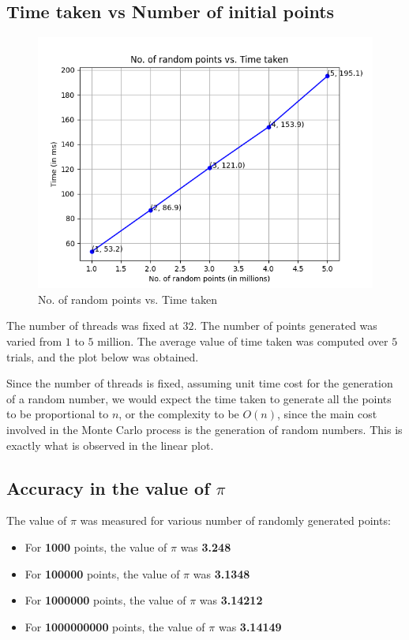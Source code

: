 \documentclass[12pt]{article}
\begin{document}
\subsection{Time taken vs Number of initial points}

\begin{figure}[H]
  \centering
  \includegraphics[width=\columnwidth]{Figure_2.png}
  \caption{No. of random points vs. Time taken}
  \label{fig-1}
  \end{figure}

  The number of threads was fixed at $32$. The number of points generated was varied from $1$ to $5$ million. The average value of time taken 
  was computed over $5$ trials, and the plot below was obtained. 

  Since the number of threads is fixed, assuming unit time cost for the generation of a random number, we would expect the time taken to generate all the points 
  to be proportional to $n$, or the complexity to be $O(n)$, since the main cost involved in the Monte Carlo process is the generation of random numbers. This is exactly what is observed 
  in the linear plot.

  \subsection{Accuracy in the value of $\pi$}
  The value of $\pi$ was measured for various number of randomly generated points:
  \begin{itemize}
    \item For \textbf{1000} points, the value of $\pi$ was \textbf{3.248}
    \item For \textbf{100000} points, the value of $\pi$ was \textbf{3.1348}
    \item For \textbf{1000000} points, the value of $\pi$ was \textbf{3.14212}
    \item For \textbf{1000000000} points, the value of $\pi$ was \textbf{3.14149}
  \end{itemize}
\end{document}
